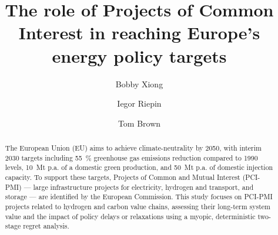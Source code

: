 \documentclass[preprint,12pt,sort&compress]{elsarticle}
\begin{document}
\begin{frontmatter}



\title{The role of Projects of Common Interest in reaching Europe's energy policy targets}


\author[affi1]{Bobby Xiong} %
\author[affil1]{Iegor Riepin}
\author[affil1]{Tom Brown}



\begin{abstract}
The European Union (EU) aims to achieve climate-neutrality by 2050, with interim 2030 targets including \SI{55}{\percent} greenhouse gas emissions reduction compared to 1990 levels, \SI{10}{Mt} p.a. of a domestic green  production, and \SI{50}{Mt} p.a. of domestic  injection capacity. To support these targets, Projects of Common and Mutual Interest (PCI-PMI) --- large infrastructure projects for electricity, hydrogen and  transport, and storage --- are identified by the European Commission. This study focuses on PCI-PMI projects related to hydrogen and carbon value chains, assessing their long-term system value and the impact of policy delays or relaxations using a myopic, deterministic two-stage regret analysis.


\end{abstract}
\end{frontmatter}
\end{document}
